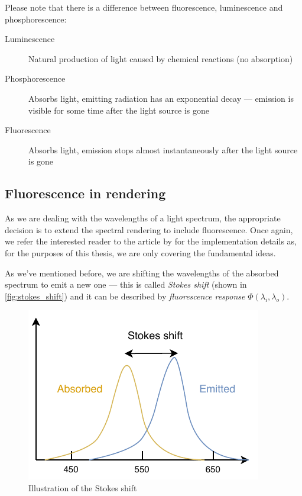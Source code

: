 Please note that there is a difference between fluorescence, luminescence and phosphorescence:

\begin{description}
	\item[Luminescence] Natural production of light caused by chemical reactions (no absorption)
	\item[Phosphorescence] Absorbs light, emitting radiation has an exponential decay --- emission is visible for some time after the light source is gone
	\item[Fluorescence] Absorbs light, emission stops almost instantaneously after the light source is gone
\end{description}

\subsection{Fluorescence in rendering}
As we are dealing with the wavelengths of a light spectrum, the appropriate decision is to extend the spectral rendering to include fluorescence. Once again, we refer the interested reader to the article by \citet{mojzik2018handling} for the implementation details as, for the purposes of this thesis,  we are only covering the fundamental ideas.

As we've mentioned before, we are shifting the wavelengths of the absorbed spectrum to emit a new one --- this is called \emph{Stokes shift} (shown in \autoref{fig:stokes_shift}) and it can be described by \emph{fluorescence response} $\Phi(\lambda_i,\lambda_o)$.

\begin{figure}
	\centering
	\includegraphics[width=0.7\linewidth]{img/stokes_shift.pdf}
	\caption{Illustration of the Stokes shift}
	\label{fig:stokes_shift}
\end{figure}


